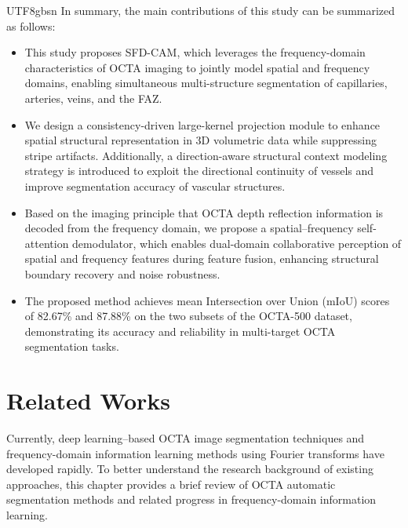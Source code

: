 \documentclass[times, review, 10pt]{elsarticle}
\begin{document}
\begin{CJK}{UTF8}{gbsn}
In summary, the main contributions of this study can be summarized as follows:
\begin{itemize}
    \item{This study proposes SFD-CAM, which leverages the frequency-domain characteristics of OCTA imaging to jointly model spatial and frequency domains, enabling simultaneous multi-structure segmentation of capillaries, arteries, veins, and the FAZ.
    }
    \item{We design a consistency-driven large-kernel projection module to enhance spatial structural representation in 3D volumetric data while suppressing stripe artifacts. Additionally, a direction-aware structural context modeling strategy is introduced to exploit the directional continuity of vessels and improve segmentation accuracy of vascular structures.
    }
    \item{Based on the imaging principle that OCTA depth reflection information is decoded from the frequency domain, we propose a spatial–frequency self-attention demodulator, which enables dual-domain collaborative perception of spatial and frequency features during feature fusion, enhancing structural boundary recovery and noise robustness.
    }
    \item{The proposed method achieves mean Intersection over Union (mIoU) scores of 82.67\% and 87.88\% on the two subsets of the OCTA-500 dataset, demonstrating its accuracy and reliability in multi-target OCTA segmentation tasks.
    }
\end{itemize}
\section{Related Works}\label{Related Works}
Currently, deep learning–based OCTA image segmentation techniques and frequency-domain information learning methods using Fourier transforms have developed rapidly. To better understand the research background of existing approaches, this chapter provides a brief review of OCTA automatic segmentation methods and related progress in frequency-domain information learning.

\end{CJK}
\end{document}
